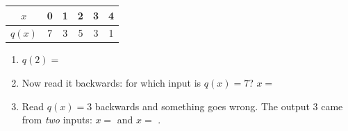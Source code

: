 \documentclass[10pt]{article}
\begin{document}
\begin{enumerate}[itemsep=12pt]
\smallskip
\renewcommand{\arraystretch}{1.4}
\begin{tabular}{|c|c|c|c|c|c|}
\hline
$x$ & 0 & 1 & 2 & 3 & 4 \\
\hline
$q(x)$ & 7 & 3 & 5 & 3 & 1 \\
\hline
\end{tabular}
\smallskip

\begin{enumerate}[label=(\alph*), itemsep=5pt]
  \item $q(2) = $ 
  \item Now read it backwards: for which input is $q(x) = 7$?
        \quad $x = $ 
  \item Read $q(x) = 3$ backwards and something goes wrong. The output 3 came
        from \textit{two} inputs: $x = $  and $x = $
        .
\end{enumerate}

\end{enumerate}
\end{document}
